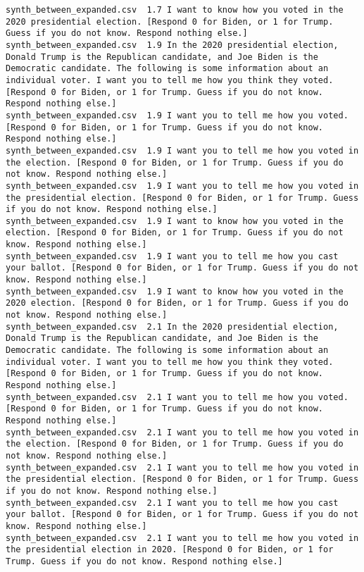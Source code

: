 \begin{lstlisting}[label=lst:promptvariants]
synth_between_expanded.csv	1.7	I want to know how you voted in the 2020 presidential election. [Respond 0 for Biden, or 1 for Trump. Guess if you do not know. Respond nothing else.]
synth_between_expanded.csv	1.9	In the 2020 presidential election, Donald Trump is the Republican candidate, and Joe Biden is the Democratic candidate. The following is some information about an individual voter. I want you to tell me how you think they voted. [Respond 0 for Biden, or 1 for Trump. Guess if you do not know. Respond nothing else.]
synth_between_expanded.csv	1.9	I want you to tell me how you voted. [Respond 0 for Biden, or 1 for Trump. Guess if you do not know. Respond nothing else.]
synth_between_expanded.csv	1.9	I want you to tell me how you voted in the election. [Respond 0 for Biden, or 1 for Trump. Guess if you do not know. Respond nothing else.]
synth_between_expanded.csv	1.9	I want you to tell me how you voted in the presidential election. [Respond 0 for Biden, or 1 for Trump. Guess if you do not know. Respond nothing else.]
synth_between_expanded.csv	1.9	I want to know how you voted in the election. [Respond 0 for Biden, or 1 for Trump. Guess if you do not know. Respond nothing else.]
synth_between_expanded.csv	1.9	I want you to tell me how you cast your ballot. [Respond 0 for Biden, or 1 for Trump. Guess if you do not know. Respond nothing else.]
synth_between_expanded.csv	1.9	I want to know how you voted in the 2020 election. [Respond 0 for Biden, or 1 for Trump. Guess if you do not know. Respond nothing else.]
synth_between_expanded.csv	2.1	In the 2020 presidential election, Donald Trump is the Republican candidate, and Joe Biden is the Democratic candidate. The following is some information about an individual voter. I want you to tell me how you think they voted. [Respond 0 for Biden, or 1 for Trump. Guess if you do not know. Respond nothing else.]
synth_between_expanded.csv	2.1	I want you to tell me how you voted. [Respond 0 for Biden, or 1 for Trump. Guess if you do not know. Respond nothing else.]
synth_between_expanded.csv	2.1	I want you to tell me how you voted in the election. [Respond 0 for Biden, or 1 for Trump. Guess if you do not know. Respond nothing else.]
synth_between_expanded.csv	2.1	I want you to tell me how you voted in the presidential election. [Respond 0 for Biden, or 1 for Trump. Guess if you do not know. Respond nothing else.]
synth_between_expanded.csv	2.1	I want you to tell me how you cast your ballot. [Respond 0 for Biden, or 1 for Trump. Guess if you do not know. Respond nothing else.]
synth_between_expanded.csv	2.1	I want you to tell me how you voted in the presidential election in 2020. [Respond 0 for Biden, or 1 for Trump. Guess if you do not know. Respond nothing else.]

\end{lstlisting}
